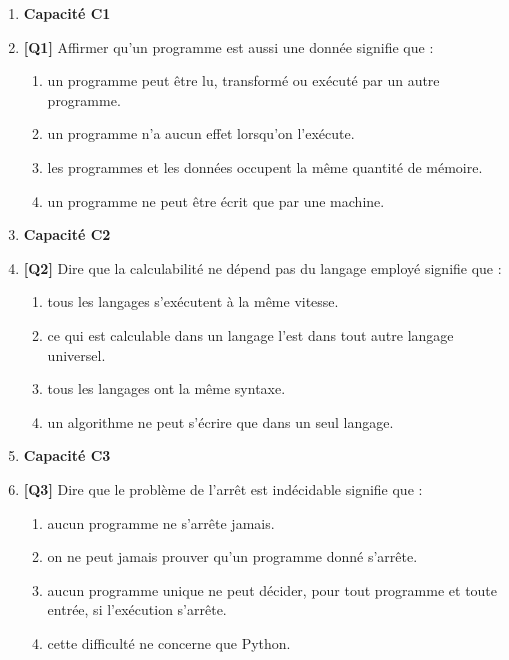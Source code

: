 \begin{enumerate}

\item[] \textbf{Capacité C1}

\item \textbf{[Q1]} Affirmer qu'un programme est aussi une donnée signifie que :
  \begin{enumerate}[label=\Alph*.]
    \item un programme peut être lu, transformé ou exécuté par un autre programme.
    \item un programme n'a aucun effet lorsqu'on l'exécute.
    \item les programmes et les données occupent la même quantité de mémoire.
    \item un programme ne peut être écrit que par une machine.
  \end{enumerate}

\item[] \textbf{Capacité C2}

\item \textbf{[Q2]} Dire que la calculabilité ne dépend pas du langage employé signifie que :
  \begin{enumerate}[label=\Alph*.]
    \item tous les langages s'exécutent à la même vitesse.
    \item ce qui est calculable dans un langage l'est dans tout autre langage universel.
    \item tous les langages ont la même syntaxe.
    \item un algorithme ne peut s'écrire que dans un seul langage.
  \end{enumerate}

\item[] \textbf{Capacité C3}

\item \textbf{[Q3]} Dire que le problème de l'arrêt est indécidable signifie que :
  \begin{enumerate}[label=\Alph*.]
    \item aucun programme ne s'arrête jamais.
    \item on ne peut jamais prouver qu'un programme donné s'arrête.
    \item aucun programme unique ne peut décider, pour tout programme et toute entrée, si l'exécution s'arrête.
    \item cette difficulté ne concerne que Python.
  \end{enumerate}


\end{enumerate}
